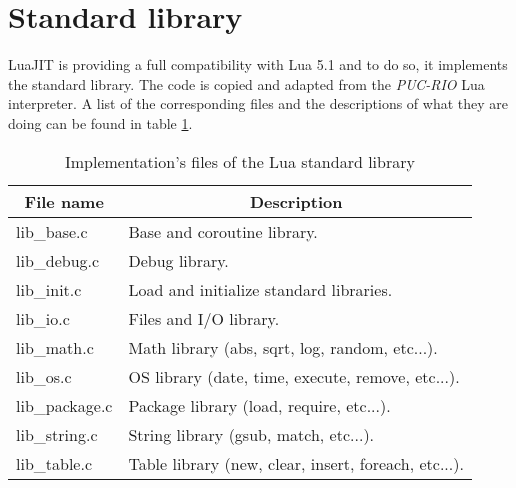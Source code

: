 

\section{Standard library}
\label{Sec:std-lib}

LuaJIT is providing a full compatibility with Lua 5.1 and to do so, it
implements the standard library. The code is copied and adapted from the
\emph{PUC-RIO} Lua interpreter. A list of the corresponding files and the
descriptions of what they are doing can be found in table
\ref{tab:library-std-files}.

\begin{table}[H]
\centering
\caption{Implementation's files of the Lua standard library}
\label{tab:library-std-files}
\begin{tabular}{|l|l|}
\hline
\multicolumn{1}{|c|}{File name} & \multicolumn{1}{c|}{Description}                     \\ \hline
lib\_base.c                     & Base and coroutine library.                          \\
lib\_debug.c                    & Debug library.                                       \\
lib\_init.c                     & Load and initialize standard libraries.              \\
lib\_io.c                       & Files and I/O library.                               \\
lib\_math.c                     & Math library (abs, sqrt, log, random, etc...).       \\
lib\_os.c                       & OS library (date, time, execute, remove, etc...).    \\
lib\_package.c                  & Package library (load, require, etc...).             \\
lib\_string.c                   & String library (gsub, match, etc...).                \\
lib\_table.c                    & Table library (new, clear, insert, foreach, etc...). \\ \hline
\end{tabular}
\end{table}


